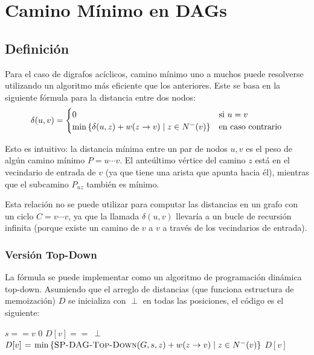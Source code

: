 \section{Camino Mínimo en DAGs}

\subsection{Definición}

Para el caso de digrafos acíclicos, camino mínimo uno a muchos puede resolverse utilizando un algoritmo más eficiente que los anteriores. Este se basa en la siguiente fórmula para la distancia entre dos nodos:
$$
    \delta(u, v) =
    \begin{cases}
        0                                                             & \text{si } u = v \\
        \min{\{\delta(u, z) + w(z \rightarrow v) \mid z \in N^-(v)\}} & \text{en caso contrario}
    \end{cases}
$$

Esto es intuitivo: la distancia mínima entre un par de nodos $u, v$ es el peso de algún camino mínimo $P = u \cdots v$. El anteúltimo vértice del camino $z$ está en el vecindario de entrada de $v$ (ya que tiene una arista que apunta hacia él), mientras que el subcamino $P_{uz}$ también es mínimo.

Esta relación no se puede utilizar para computar las distancias en un grafo con un ciclo $C = v \cdots v$, ya que la llamada $\delta(u, v)$ llevaría a un bucle de recursión infinita (porque existe un camino de $v$ a $v$ a través de los vecindarios de entrada).

\subsubsection{Versión Top-Down}

La fórmula se puede implementar como un algoritmo de programación dinámica top-down. Asumiendo que el arreglo de distancias (que funciona estructura de memoización) $D$ se inicializa con $\perp$ en todas las posiciones, el código es el siguiente:

\begin{codebox}
    \li \If $s == v$ \Then
    \li \Return $0$
    \End
    \li \If $D[v] ==\ \perp$ \Then
    \li $D[v] \mathrel{\hspace{1pt}=\hspace{1pt}} \min{\{\textnormal{\scshape SP-DAG-Top-Down}(G, s, z) + w(z \rightarrow v) \mid z \in N^-(v)\}}$
    \End
    \li \Return $D[v]$
\end{codebox}


